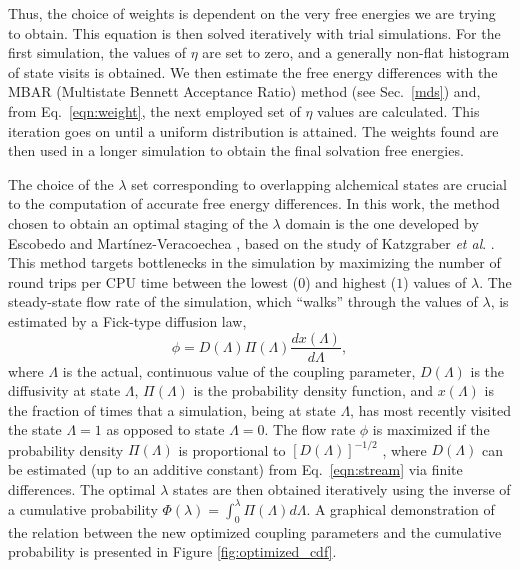 \documentclass[preprint]{elsarticle}
\begin{document}
	Thus, the choice of weights is dependent on the very free energies we are trying to obtain. This equation is then solved iteratively with trial simulations. For the first simulation, the values of $\eta$ are set to zero, and a generally non-flat histogram of state visits is obtained. We then estimate the free energy differences with the MBAR (Multistate Bennett Acceptance Ratio) method \cite{mbar} (see Sec.~\ref{mds}) and, from Eq.~\eqref{eqn:weight}, the next employed set of $\eta$ values are calculated. This iteration goes on until a uniform distribution is attained. The weights found are then used in a longer simulation to obtain the final solvation free energies.
	
	The choice of the $\lambda$ set corresponding to overlapping alchemical states are crucial to the computation of accurate free energy differences. In this work, the method chosen to obtain an optimal staging of the $\lambda$ domain is the one developed by Escobedo and Mart\'{i}nez-Veracoechea \cite{escobedo2007}, based on the study of Katzgraber \textit{et al}. \cite{1742-5468-2006-03-P03018}. This method targets bottlenecks in the simulation by maximizing the number of round trips per CPU time between the lowest ($0$) and highest ($1$) values of $\lambda$. The steady-state flow rate of the simulation, which ``walks'' through the values of $\lambda$, is estimated by a Fick-type diffusion law,
	\begin{equation}
	\phi = D(\Lambda) \Pi (\Lambda) \dfrac{dx(\Lambda)}{d \Lambda},
	\label{eqn:stream}
	\end{equation}
	where $\Lambda$ is the actual, continuous value of the coupling parameter, $D(\Lambda)$ is the diffusivity at state $\Lambda$, $\Pi(\Lambda)$ is the probability density function, and $x(\Lambda)$ is the fraction of times that a simulation, being at state $\Lambda$, has most recently visited the state $\Lambda=1$ as opposed to state $\Lambda=0$. The flow rate $\phi$ is maximized if the probability density $\Pi(\Lambda)$ is proportional to $[D(\Lambda)]^{-1/2}$ \cite{escobedo2007,1742-5468-2006-03-P03018}, where $D(\Lambda)$ can be estimated (up to an additive constant) from Eq.~\eqref{eqn:stream} via finite differences. The optimal $\lambda$ states are then obtained iteratively using the inverse of a cumulative probability $\Phi(\lambda) = \int_0^\lambda \Pi(\Lambda) d\Lambda$. A graphical demonstration of the relation between the new optimized coupling parameters and the cumulative probability is presented in Figure \ref{fig:optimized_cdf}.
	
\end{document}
